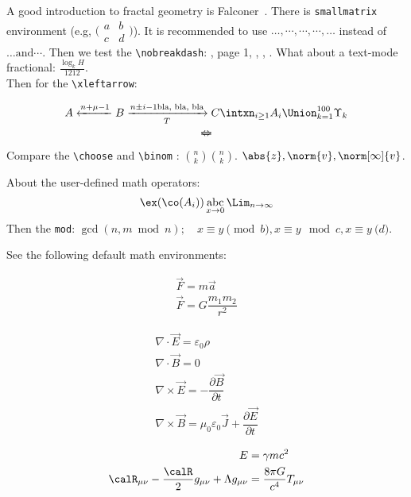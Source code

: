 


A good introduction to fractal geometry is Falconer~\cite{Falconer2003}. There is \verb|smallmatrix| environment (e.g, $\big(\begin{smallmatrix}
	a & b\\ c&d
\end{smallmatrix}\big)$). It is recommended to use $ \dotsc, \dotsb, \dotsm, \dotsi, \dotso $ instead of $ \ldots \text{and} \cdots$. Then we test the \verb|\nobreakdash|: \padic, page 1, \ndiml, \ndiml[1], \sigmaAlg.
What about a text-mode fractional: $ \tfrac{\log_{k} H}{1212} $.\\[20pt]
Then for the \verb|\xleftarrow|:

\begin{equation}\label{eq:arrow}
	A \xleftarrow{n+\mu-1} B \xrightarrow[T]{n\pm i-1 \text{bla, bla, bla}}	C \intxn_{i\geq 1} A_{i} \Union_{k=1}^{100}\Upsilon_{k}
\end{equation}
\[ \Leftarrow \mspace{-18.0mu} \Rightarrow \] %

Compare the \verb|\choose| and \verb|\binom| : $ {n \choose k} \binom{n}{k}$. $ \abs{z}, \norm{v}, \norm[\infty]{v} $.

About the user-defined math operators:
\[ \ex(\co(A_{i})) \operatorname*{abc}_{x\to 0} \Lim_{n\to \infty}\]
Then the \verb|mod|: $ \gcd(n,m\bmod n); \quad x \equiv y \pmod b, x \equiv y \mod c, x \equiv y \pod d $.

See the following default math environments:

\begin{multline}\label{eq:newton}
	\vec{F} = m\vec{a} \\
	\vec{F} = G \dfrac{m_{1}m_{2}}{r^{2}}
\end{multline}

\begin{subequations}\label{eq:maxwell}
	\begin{gather}
		\nabla\cdot \vec{E} = \varepsilon_{0}\rho \\
		\nabla \cdot \vec{B} = 0 \\
		\nabla \times \vec{E} = -\dfrac{\partial \vec{B}}{\partial t}\\
		\nabla \times \vec{B} = \mu_{0}\varepsilon_{0} \vec{J} + \dfrac{\partial \vec{E}}{\partial t}
	\end{gather}
\end{subequations}

\begin{equation}\label{eq:einstein}
	\begin{split}
		E& =\gamma mc^{2}
		\\
		\calR_{\mu\nu} - \dfrac{\calR}{2}g_{\mu\nu} + \Lambda g_{\mu\nu} & = \dfrac{8\pi G}{c^{4}} T_{\mu\nu}
	\end{split}
\end{equation}

